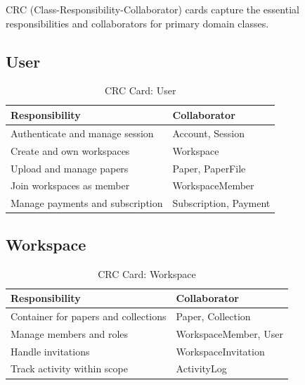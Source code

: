 CRC (Class-Responsibility-Collaborator) cards capture the essential responsibilities and collaborators for primary domain classes.

\subsection{User}

\begin{table}[H]
    \centering
    \small
    \begin{tabularx}{\textwidth}{|l|X|}
        \hline
        \textbf{Responsibility}          & \textbf{Collaborator} \\
        \hline
        Authenticate and manage session  & Account, Session      \\
        \hline
        Create and own workspaces        & Workspace             \\
        \hline
        Upload and manage papers         & Paper, PaperFile      \\
        \hline
        Join workspaces as member        & WorkspaceMember       \\
        \hline
        Manage payments and subscription & Subscription, Payment \\
        \hline
    \end{tabularx}
    \caption{CRC Card: User}
    \label{tab:crc-user}
\end{table}

\subsection{Workspace}

\begin{table}[H]
    \centering
    \small
    \begin{tabularx}{\textwidth}{|l|X|}
        \hline
        \textbf{Responsibility}              & \textbf{Collaborator} \\
        \hline
        Container for papers and collections & Paper, Collection     \\
        \hline
        Manage members and roles             & WorkspaceMember, User \\
        \hline
        Handle invitations                   & WorkspaceInvitation   \\
        \hline
        Track activity within scope          & ActivityLog           \\
        \hline
    \end{tabularx}
    \caption{CRC Card: Workspace}
    \label{tab:crc-workspace}
\end{table}

